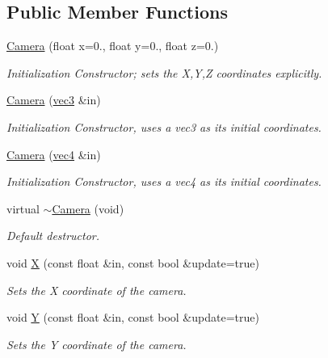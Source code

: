 \subsection*{Public Member Functions}
\begin{DoxyCompactItemize}
\item 
\hyperlink{class_camera_a47104bf17f448c97bf7bb34360ab8fcc}{Camera} (float x=0., float y=0., float z=0.)
\begin{DoxyCompactList}\small\item\em Initialization Constructor; sets the X,Y,Z coordinates explicitly. \end{DoxyCompactList}\item 
\hyperlink{class_camera_a388c39247312dc6850b2d1b007efb423}{Camera} (\hyperlink{struct_angel_1_1vec3}{vec3} \&in)
\begin{DoxyCompactList}\small\item\em Initialization Constructor, uses a vec3 as its initial coordinates. \end{DoxyCompactList}\item 
\hyperlink{class_camera_a30b637b0e81821106c16a8a299d24d3f}{Camera} (\hyperlink{struct_angel_1_1vec4}{vec4} \&in)
\begin{DoxyCompactList}\small\item\em Initialization Constructor, uses a vec4 as its initial coordinates. \end{DoxyCompactList}\item 
virtual \hyperlink{class_camera_a06211f202c145b3ec8253f96e1e654a6}{$\sim$\-Camera} (void)
\begin{DoxyCompactList}\small\item\em Default destructor. \end{DoxyCompactList}\item 
void \hyperlink{class_camera_a7ff7cf14bee873ac6cda7b2e42a60358}{X} (const float \&in, const bool \&update=true)
\begin{DoxyCompactList}\small\item\em Sets the X coordinate of the camera. \end{DoxyCompactList}\item 
void \hyperlink{class_camera_a69af560bb7f85db3a5062d1a6b3927bf}{Y} (const float \&in, const bool \&update=true)
\begin{DoxyCompactList}\small\item\em Sets the Y coordinate of the camera. \end{DoxyCompactList}\item 

\end{DoxyCompactItemize}
